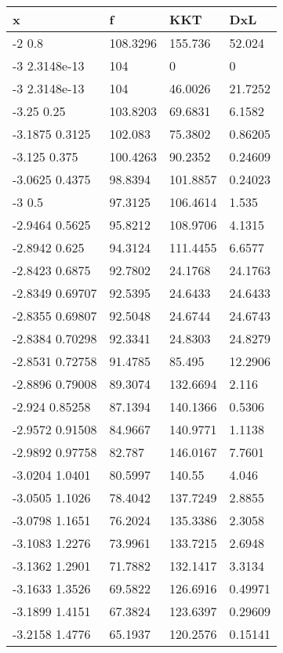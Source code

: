 \begin{tabular}{llll}
x & f & KKT & DxL \\ 
\hline 
-2         0.8 & 108.3296 & 155.736 & 52.024 \\ 
-3  2.3148e-13 & 104 & 0 & 0 \\ 
-3  2.3148e-13 & 104 & 46.0026 & 21.7252 \\ 
-3.25        0.25 & 103.8203 & 69.6831 & 6.1582 \\ 
-3.1875      0.3125 & 102.083 & 75.3802 & 0.86205 \\ 
-3.125       0.375 & 100.4263 & 90.2352 & 0.24609 \\ 
-3.0625      0.4375 & 98.8394 & 101.8857 & 0.24023 \\ 
-3         0.5 & 97.3125 & 106.4614 & 1.535 \\ 
-2.9464      0.5625 & 95.8212 & 108.9706 & 4.1315 \\ 
-2.8942       0.625 & 94.3124 & 111.4455 & 6.6577 \\ 
-2.8423      0.6875 & 92.7802 & 24.1768 & 24.1763 \\ 
-2.8349     0.69707 & 92.5395 & 24.6433 & 24.6433 \\ 
-2.8355     0.69807 & 92.5048 & 24.6744 & 24.6743 \\ 
-2.8384     0.70298 & 92.3341 & 24.8303 & 24.8279 \\ 
-2.8531     0.72758 & 91.4785 & 85.495 & 12.2906 \\ 
-2.8896     0.79008 & 89.3074 & 132.6694 & 2.116 \\ 
-2.924     0.85258 & 87.1394 & 140.1366 & 0.5306 \\ 
-2.9572     0.91508 & 84.9667 & 140.9771 & 1.1138 \\ 
-2.9892     0.97758 & 82.787 & 146.0167 & 7.7601 \\ 
-3.0204      1.0401 & 80.5997 & 140.55 & 4.046 \\ 
-3.0505      1.1026 & 78.4042 & 137.7249 & 2.8855 \\ 
-3.0798      1.1651 & 76.2024 & 135.3386 & 2.3058 \\ 
-3.1083      1.2276 & 73.9961 & 133.7215 & 2.6948 \\ 
-3.1362      1.2901 & 71.7882 & 132.1417 & 3.3134 \\ 
-3.1633      1.3526 & 69.5822 & 126.6916 & 0.49971 \\ 
-3.1899      1.4151 & 67.3824 & 123.6397 & 0.29609 \\ 
-3.2158      1.4776 & 65.1937 & 120.2576 & 0.15141 \\ 

\end{tabular}
